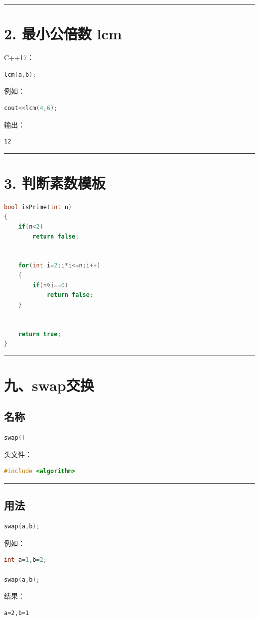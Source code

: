 \documentclass[9pt,twocolumn]{extarticle}
\begin{document}
\noindent\rule{\linewidth}{0.4pt}

\section{2. 最小公倍数 lcm}

C++17：
\begin{lstlisting}[language=C++]
lcm(a,b);
\end{lstlisting}
例如：
\begin{lstlisting}[language=C++]
cout<<lcm(4,6);
\end{lstlisting}
输出：
\begin{lstlisting}
12
\end{lstlisting}

\noindent\rule{\linewidth}{0.4pt}

\section{3. 判断素数模板}
\begin{lstlisting}[language=C++]
bool isPrime(int n)
{
    if(n<2)
        return false;


    for(int i=2;i*i<=n;i++)
    {
        if(n%i==0)
            return false;
    }


    return true;
}
\end{lstlisting}

\noindent\rule{\linewidth}{0.4pt}

\section{九、swap交换}

\subsection{名称}
\begin{lstlisting}[language=C++]
swap()
\end{lstlisting}
头文件：
\begin{lstlisting}[language=C++]
#include <algorithm>
\end{lstlisting}

\noindent\rule{\linewidth}{0.4pt}

\subsection{用法}
\begin{lstlisting}[language=C++]
swap(a,b);
\end{lstlisting}
例如：
\begin{lstlisting}[language=C++]
int a=1,b=2;

swap(a,b);
\end{lstlisting}
结果：
\begin{lstlisting}
a=2,b=1
\end{lstlisting}
\end{document}
